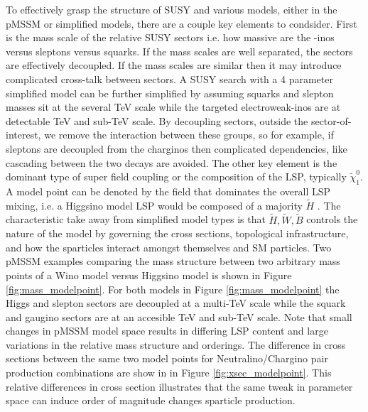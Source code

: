 To effectively grasp the structure of SUSY and various models, either in the pMSSM or simplified models, there are a couple key elements to condsider. First is the mass scale of the relative SUSY sectors i.e. how massive are the -inos versus sleptons versus squarks. If the mass scales are well separated, the sectors are effectively decoupled. If the mass scales are similar then it may introduce complicated cross-talk between sectors. A SUSY search with a 4 parameter simplified model can be further simplified by assuming squarks and slepton masses sit at the several TeV scale while the targeted electroweak-inos are at detectable TeV and sub-TeV scale.  By decoupling sectors, outside the sector-of-interest, we remove the interaction between these groups, so for example, if sleptons are decoupled from the charginos then complicated dependencies, like cascading between the two decays are avoided. The other key element is the dominant type of super field coupling or the composition of the LSP, typically $\tilde{\chi}^0_1$.  A model point can be denoted by the field that dominates the overall LSP mixing, i.e. a Higgsino model LSP would be composed of a majority $\tilde{H}$ \cite{ATLAS:2015wrn}. The characteristic take away from simplified model types is that $\tilde{H},\tilde{W},\tilde{B}$ controls the nature of the model by governing the cross sections, topological infrastructure, and how the sparticles interact amongst themselves and SM particles. Two pMSSM examples comparing the mass structure between two arbitrary mass points of a Wino model versus Higgsino model is shown in Figure \ref{fig:mass_modelpoint}. For both models in Figure \ref{fig:mass_modelpoint} the Higgs and slepton sectors are decoupled at a multi-TeV scale while the squark and gaugino sectors are at an accesible TeV and sub-TeV scale. Note that small changes in pMSSM model space results in differing LSP content and large variations in the relative mass structure and orderings. The difference in cross sections between the same two model points for Neutralino/Chargino pair production combinations are show in in Figure \ref{fig:xsec_modelpoint}. This relative differences in cross section illustrates that the same tweak in parameter space can induce order of magnitude changes sparticle production.



